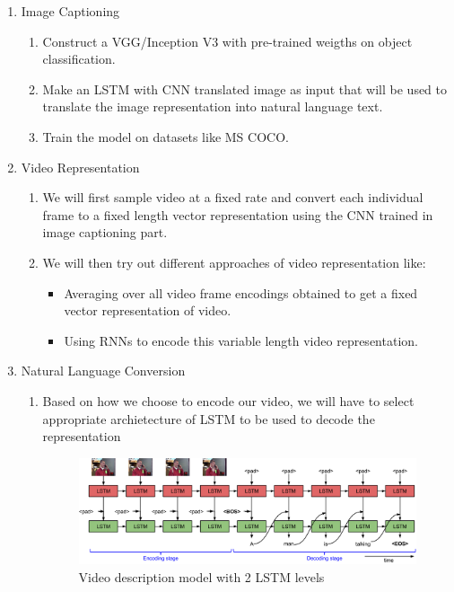 \documentclass{article}
\begin{document}
		\begin{enumerate}
			\item Image Captioning
			\begin{enumerate}
				\item
					Construct a VGG/Inception V3 with pre-trained weigths on object classification.
				\item
					Make an LSTM with CNN translated image as input that will be used to translate the image representation into natural language text.
				\item
					Train the model on datasets like MS COCO.
			\end{enumerate}
			\item Video Representation
			\begin{enumerate}
				\item
					We will first sample video at a fixed rate and convert each individual frame to a fixed length vector representation using the CNN trained in image captioning part.
				\item
					We will then try out different approaches of video representation like:
					\begin{itemize}
						\item
							Averaging over all video frame encodings obtained to get a fixed vector representation of video.
						\item
							Using RNNs to encode this variable length video representation.
					\end{itemize}					
			\end{enumerate}
			\item Natural Language Conversion
			\begin{enumerate}
				\item
					Based on how we choose to encode our video, we will have to select appropriate archietecture of LSTM to be used to decode the representation
				\begin{figure}[ht!]
				\centering
					\includegraphics[width=10cm]{s2vt.png}
					\caption{Video description model with 2 LSTM levels\label{fig1}}
				\end{figure}


\end{enumerate}
\end{enumerate}
\end{document}
